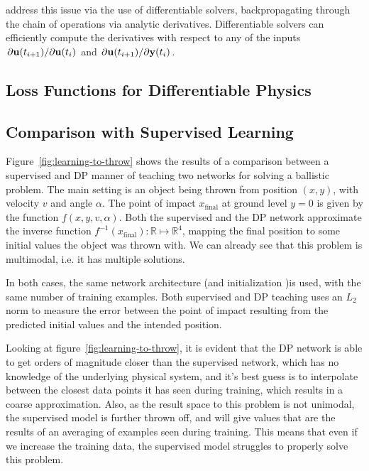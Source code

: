 \cite{holl2019pdecontrol} address this issue via the use of differentiable
solvers, backpropagating through the chain of operations via analytic
derivatives.  Differentiable solvers can efficiently compute the derivatives
with respect to any of the inputs $\pdv*{\vb{u}(t_{i+1})}{\vb{u}(t_i)}$ and
$\pdv*{\vb{u}(t_{i+1})}{\vb{y}(t_i)}$. 

\subsection{Loss Functions for Differentiable Physics}
\label{dp-loss}


\subsection{Comparison with Supervised Learning}
Figure~\ref{fig:learning-to-throw} shows the results of a comparison between
a supervised and \acf{DP} manner of teaching two networks for solving
a ballistic problem. The main setting is an object being thrown from position
$(x,y)$, with velocity $v$ and angle $\alpha$. The point of impact
$x_{\text{final}}$ at ground level $y=0$ is given by the function
$f(x,y,v,\alpha)$. Both the supervised and the \ac{DP} network approximate the
inverse function $f^{-1}(x_{\text{final}}): \mathbb{R} \mapsto \mathbb{R}^4$,
mapping the final position to some initial values the object was thrown with. We
can already see that this problem is multimodal, i.e. it has multiple solutions.

In both cases, the same network architecture (and initialization )is used, with
the same number of training examples. Both supervised and \ac{DP} teaching uses
an $L_2$ norm to measure the error between the point of impact resulting from
the predicted initial values and the intended position.

Looking at figure~\ref{fig:learning-to-throw}, it is evident that the DP network
is able to get orders of magnitude closer than the supervised network, which has
no knowledge of the underlying physical system, and it's best guess is to
interpolate between the closest data points it has seen during training, which
results in a coarse approximation. Also, as the result space to this problem is
not unimodal, the supervised model is further thrown off, and will give values
that are the results of an averaging of examples seen during training. This
means that even if we increase the training data, the supervised model struggles
to properly solve this problem.  

